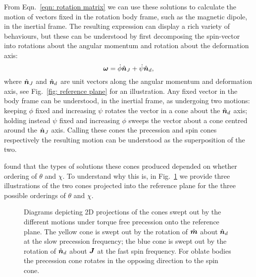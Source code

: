 \documentclass[../full_thesis/full_thesis.tex]{subfiles}
\begin{document}
From Eqn.~\eqref{eqn: rotation matrix} we can use these solutions to calculate
the motion of vectors fixed in the rotation body frame, such as the magnetic
dipole, in the inertial frame. The resulting expression can display a rich
variety of behaviours, but these can be understood by first decomposing the
spin-vector into rotations about the angular momentum and rotation about the
deformation axis:
\begin{equation}
  \boldsymbol{\omega} = \dot{\phi}\hat{\boldsymbol{n}}_{J} + \dot{\psi}\hat{\boldsymbol{n}}_{d},
\label{eqn: decomp}
\end{equation}
where $\hat{\boldsymbol{n}}_J$ and $\hat{\boldsymbol{n}}_d$ are unit vectors along the angular momentum and deformation
axis, see Fig.~\ref{fig: reference plane} for an illustration.
Any fixed vector in the body frame can be understood, in the inertial frame, as
undergoing two motions: keeping $\phi$ fixed and increasing $\psi$ rotates the
vector in a cone about the $\hat{\boldsymbol{n}}_{d}$ axis; holding instead $\psi$ fixed and
increasing $\phi$ sweeps the vector about a cone centred around the $\hat{\boldsymbol{n}}_{J}$
axis. Calling these cones the precession and spin cones respectively the
resulting motion can be understood as the superposition of the two.

\citet{Jones2001} found that the types of solutions these cones produced
depended on whether ordering of $\theta$ and $\chi$. To understand why this is, in
Fig.~\ref{fig: cones} we provide three illustrations of the two cones projected
into the reference plane for the three possible orderings of $\theta$ and $\chi$.
\begin{figure}[ht]
\centering
\caption{Diagrams depicting 2D projections of the cones swept out by the
    different motions under torque free precession onto the reference plane.
    The yellow cone is swept out by the rotation of $\hat{\boldsymbol{m}}$ about $\hat{\boldsymbol{n}}_{d}$ at the
    slow precession frequency; the blue cone is swept out by the rotation of
    $\hat{\boldsymbol{n}}_{d}$ about $\boldsymbol{J}$ at the fast spin frequency. For oblate bodies the
precession cone rotates in the opposing direction to the spin cone.}
\label{fig: cones}
\end{figure}
\end{document}
